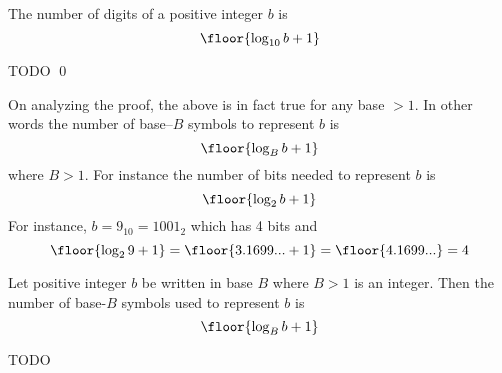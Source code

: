 \begin{prop}
  The number of digits of a positive integer $b$ is
  \[
  \floor{\log_{10} b + 1}
  \]
\end{prop}
\proof
TODO
\qed

On analyzing the proof, the above is in fact true for any base $> 1$.
In other words the number of base--$B$ symbols to represent $b$ is
\[
\floor{\log_{B} b + 1}
\]
where $B > 1$.
For instance the number of bits needed to represent $b$ is
\[
\floor{\log_{2} b + 1}
\]
For instance, $b = 9_{10} = 1001_2$ which has 4 bits and
\[
\floor{\log_{2} 9 + 1}
= \floor{3.1699... + 1}
= \floor{4.1699...}
= 4
\]

\begin{prop}
  Let positive integer $b$ be written in base $B$ where $B > 1$ is an integer.
  Then the number of base-$B$ symbols used to represent $b$ is
  \[
  \floor{\log_{B} b + 1}
  \]
\end{prop}
\proof
TODO




